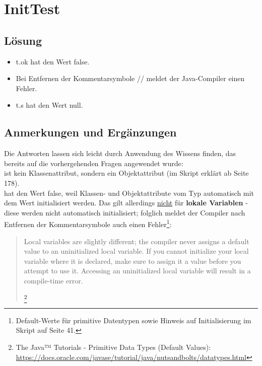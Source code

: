 \chapter{InitTest}\label{inittest}

\section*{Lösung}

\begin{itemize}
    \item t.ok hat den Wert false.
    \item Bei Entfernen der Kommentarsymbole // meldet der Java-Compiler einen Fehler.
    \item t.s hat den Wert null.
\end{itemize}


\section*{Anmerkungen und Ergänzungen}

Die Antworten lassen sich leicht durch Anwendung des Wissens finden, das bereits auf die vorhergehenden Fragen angewendet wurde:\\

 ist kein Klassenattribut, sondern ein Objektattribut (im Skript erklärt ab Seite 178).\\

 hat den Wert false, weil Klassen- und Objektattribute vom Typ  automatisch mit dem Wert  initialisiert
werden.
Das gilt allerdings \underline{nicht} für \textbf{lokale Variablen} - diese werden nicht automatisch initialisiert; folglich meldet der Compiler
nach Entfernen der Kommentarsymbole auch einen Fehler\footnote{
    Default-Werte für primitive Datentypen sowie Hinweis auf Initialisierung im Skript auf Seite 41.
}:

\blockquote[\footnote{
The Java™ Tutorials - Primitive Data Types (Default Values): \url{https://docs.oracle.com/javase/tutorial/java/nutsandbolts/datatypes.html}
}]{
    Local variables are slightly different; the compiler never assigns a default value to an uninitialized local variable.
    If you cannot initialize your local variable where it is declared, make sure to assign it a value before you attempt to use it.
    Accessing an uninitialized local variable will result in a compile-time error.
}



